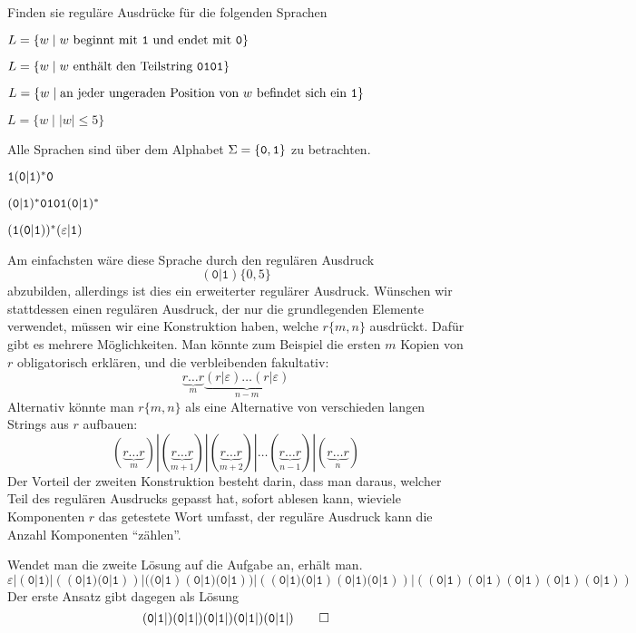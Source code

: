 Finden sie reguläre Ausdrücke für die folgenden Sprachen
\begin{teilaufgaben}
\item $L=\{w\mid \text{$w$ beginnt mit {\tt 1} und endet mit {\tt 0}}\}$
\item $L=\{w\mid \text{$w$ enthält den Teilstring {\tt 0101}}\}$
\item $L=\{w\mid \text{an jeder ungeraden Position von $w$ befindet sich ein {\tt 1}}\}$
\item $L=\{w\mid |w|\le 5\}$
\end{teilaufgaben}
Alle Sprachen sind über dem Alphabet $\Sigma=\{{\tt 0},{\tt 1}\}$ zu
betrachten.


\begin{loesung}
\begin{teilaufgaben}
\item ${\tt 1}({\tt 0}|{\tt 1})^*{\tt 0}$
\item $({\tt 0}|{\tt 1})^* {\tt 0101} ({\tt 0}|{\tt 1})^*$
\item $({\tt 1}({\tt 0}|{\tt 1}))^*(\varepsilon|{\tt 1})$
\item
Am einfachsten wäre diese Sprache durch den regulären Ausdruck 
\[
(\texttt{0}|\texttt{1})\{0,5\}
\]
abzubilden, allerdings ist dies ein erweiterter regulärer Ausdruck.
Wünschen wir stattdessen einen regulären Ausdruck, der nur die
grundlegenden Elemente verwendet, müssen wir eine Konstruktion haben,
welche $r\{m,n\}$ ausdrückt. Dafür gibt es mehrere Möglichkeiten.
Man könnte zum Beispiel die ersten $m$ Kopien von $r$ obligatorisch
erklären, und die verbleibenden fakultativ:
\[
\underbrace{r\dots r}_m\underbrace{(r|\varepsilon)\dots(r|\varepsilon)}_{n-m}
\]
Alternativ könnte man $r\{m,n\}$ als eine Alternative von verschieden langen
Strings aus $r$ aufbauen:
\[
(\underbrace{r\dots r}_m)|
(\underbrace{r\dots r}_{m+1})|
(\underbrace{r\dots r}_{m+2})|\dots
(\underbrace{r\dots r}_{n - 1})|
(\underbrace{r\dots r}_{n})
\]
Der Vorteil der zweiten Konstruktion besteht darin, dass man daraus, welcher
Teil des regulären Ausdrucks gepasst hat, sofort ablesen kann, wieviele
Komponenten $r$ das getestete Wort umfasst, der reguläre Ausdruck kann
die Anzahl Komponenten ``zählen''.

Wendet man die zweite Lösung auf die Aufgabe an, erhält man.
\[
\varepsilon|
(\texttt{0}|\texttt{1})|
((\texttt{0}|\texttt{1}) (\texttt{0}|\texttt{1}))|
((\texttt{0}|\texttt{1}) (\texttt{0}|\texttt{1}) (\texttt{0}|\texttt{1}))|
((\texttt{0}|\texttt{1}) (\texttt{0}|\texttt{1}) (\texttt{0}|\texttt{1}) (\texttt{0}|\texttt{1}))|
((\texttt{0}|\texttt{1}) (\texttt{0}|\texttt{1}) (\texttt{0}|\texttt{1}) (\texttt{0}|\texttt{1}) (\texttt{0}|\texttt{1}))
\]
Der erste Ansatz gibt dagegen als Lösung
\[
(\texttt{0}|\texttt{1}|)
(\texttt{0}|\texttt{1}|)
(\texttt{0}|\texttt{1}|)
(\texttt{0}|\texttt{1}|)
(\texttt{0}|\texttt{1}|)
\qedhere
\]
\end{teilaufgaben}
\end{loesung}

